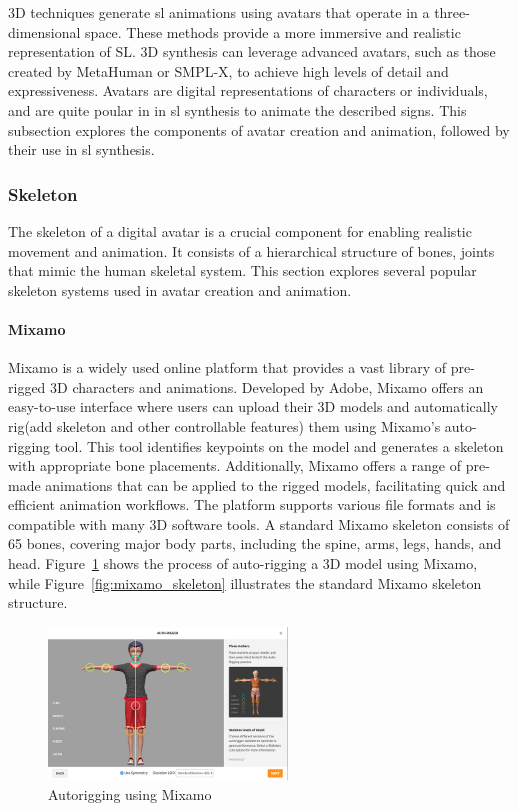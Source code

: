 \documentclass[../../main.tex]{subfiles}
\begin{document}
3D techniques generate \gls{sl} animations using avatars that operate in a three-dimensional space. These methods provide a more immersive and realistic representation of SL. 3D synthesis can leverage advanced avatars, such as those created by MetaHuman or SMPL-X, to achieve high levels of detail and expressiveness. Avatars are digital representations of characters or individuals, and are quite poular in in \gls{sl} synthesis to animate the described signs. This subsection explores the components of avatar creation and animation, followed by their use in \gls{sl} synthesis.

\subsubsection{Skeleton}
\label{ch:background_work:sign_language_synthesis:3d_techniques:skeleton}

The skeleton of a digital avatar is a crucial component for enabling realistic movement and animation. It consists of a hierarchical structure of bones, joints that mimic the human skeletal system. This section explores several popular skeleton systems used in avatar creation and animation.

\paragraph{Mixamo}
\label{ch:background_work:sign_language_synthesis:3d_techniques:skeleton:mixamo}

Mixamo is a widely used online platform that provides a vast library of pre-rigged 3D characters and animations. Developed by Adobe, Mixamo offers an easy-to-use interface where users can upload their 3D models and automatically rig(add skeleton and other controllable features) them using Mixamo's auto-rigging tool. This tool identifies keypoints on the model and generates a skeleton with appropriate bone placements. Additionally, Mixamo offers a range of pre-made animations that can be applied to the rigged models, facilitating quick and efficient animation workflows. The platform supports various file formats and is compatible with many 3D software tools. A standard Mixamo skeleton consists of 65 bones, covering major body parts, including the spine, arms, legs, hands, and head. Figure~\ref{fig:mixamo_autorigging} shows the process of auto-rigging a 3D model using Mixamo, while Figure~\ref{fig:mixamo_skeleton} illustrates the standard Mixamo skeleton structure.

\begin{figure} 
  \centering \includegraphics[width = 2.5in]{chapters/background_work/images/mixamo_autorigging.png} 
  \caption{Autorigging using Mixamo} 
  \label{fig:mixamo_autorigging} 
\end{figure}
\end{document}
